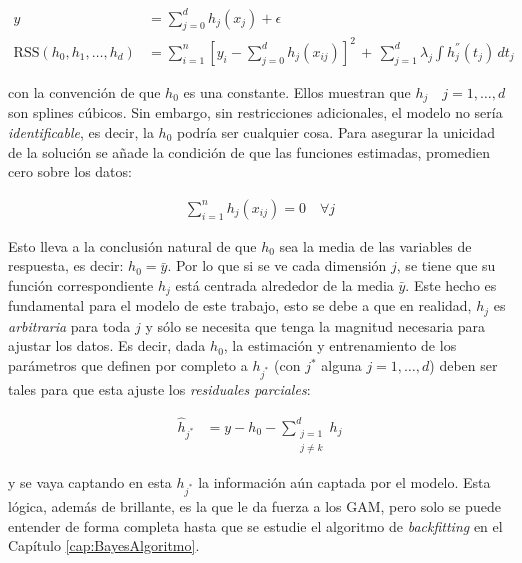 \documentclass[../Main/Main.tex]{subfiles}
\begin{document}
\begin{align*}
	y &= \sum_{j = 0}^d h_j(x_j) + \epsilon \\	
	\text{RSS}(h_0, h_1, \ldots, h_d) &= \sum_{i = 1}^n[y_i - \sum_{j = 0}^d h_j(x_{ij})]^2 \, + \, \sum_{j = 1}^d\lambda_j 			\int h_j^{''}(t_j) \, dt_j
\end{align*}

con la convención de que $h_0$ es una constante. Ellos muestran que $h_j \quad j = 1,\ldots,d$ son splines cúbicos. Sin embargo, sin restricciones adicionales, el modelo no sería \textit{identificable}, es decir, la $h_0$ podría ser cualquier cosa. Para asegurar la unicidad de la solución se añade la condición de que las funciones estimadas, promedien cero sobre los datos:

\begin{align}
	\sum_{i = 1}^n h_j(x_{ij}) = 0 \quad \forall j \label{ec:RestriccionGAM}
\end{align}

Esto lleva a la conclusión natural de que $h_0$ sea la media de las variables de respuesta, es decir: $h_0 = \bar{y}$. Por lo que si se ve cada dimensión $j$, se tiene que su función correspondiente $h_j$ está centrada alrededor de la media $\bar{y}$. Este hecho es fundamental para el modelo de este trabajo, esto se debe a que en realidad, $h_j$ es \textit{arbitraria} para toda $j$ y sólo se necesita que tenga la magnitud necesaria para ajustar los datos. Es decir, dada $h_0$, la estimación y entrenamiento de los parámetros que definen por completo a $h_{j^*}$ (con $j^*$ alguna $j=1,\ldots,d$) deben ser tales para que esta ajuste los \textit{residuales parciales}:

\begin{align}
\hat{h}_{j^*} &= y - h_0 - \sum_{\substack{j=1\\ j \neq k}}^d h_j \label{ec:ResParciales}
\end{align}

y se vaya captando en esta $h_{j^*}$ la información aún captada por el modelo. Esta lógica, además de brillante, es la que le da fuerza a los GAM, pero solo se puede entender de forma completa hasta que se estudie el algoritmo de \textit{backfitting} en el Capítulo \ref{cap:BayesAlgoritmo}. \\
\end{document}

